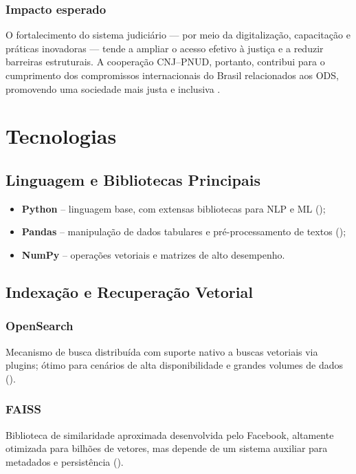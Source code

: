 \subsection*{Impacto esperado}
O fortalecimento do sistema judiciário — por meio da digitalização,
capacitação e práticas inovadoras — tende a ampliar o acesso efetivo à justiça e
a reduzir barreiras estruturais. A cooperação CNJ–PNUD, portanto, contribui para
o cumprimento dos compromissos internacionais do Brasil relacionados aos ODS,
promovendo uma sociedade mais justa e inclusiva
\cite{undp2025pnudcnj}.




\chapter{Tecnologias}
\label{chap:tecnologias}

\section{Linguagem e Bibliotecas Principais}
\begin{itemize}[label=\textbullet]
  \item \textbf{Python} – linguagem base, com extensas bibliotecas para NLP e ML (\cite{python2024});
  \item \textbf{Pandas} – manipulação de dados tabulares e pré-processamento de textos (\cite{pandas2024});
  \item \textbf{NumPy} – operações vetoriais e matrizes de alto desempenho.
\end{itemize}

\section{Indexação e Recuperação Vetorial}
\subsection{OpenSearch}
Mecanismo de busca distribuída com suporte nativo a buscas vetoriais via plugins; ótimo para cenários de alta disponibilidade e grandes volumes de dados (\cite{taipalus2024vector}).

\subsection{FAISS}
Biblioteca de similaridade aproximada desenvolvida pelo Facebook, altamente otimizada para bilhões de vetores, mas depende de um sistema auxiliar para metadados e persistência (\cite{facebookresearch2024faiss}).

